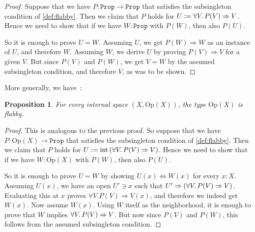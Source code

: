 \documentclass[11pt, oneside, article]{memoir}
\theoremstyle{plain}
\newtheorem{proposition}[theorem]{Proposition}
\theoremstyle{definition}
\theoremstyle{remark}
\DeclareMathOperator{\interior}{int}
\newcommand{\const}[1]{\mathtt{#1}}
\newcommand{\Set}[1]{\mathrm{#1}}
\newcommand{\Prop}{\const{Prop}}
\newcommand{\Op}{\Set{Op}}
\newcommand{\imp}{\Rightarrow}
\begin{document}
\begin{proof}
Suppose that we have $P : \Prop \to \Prop$ that satisfies the subsingleton condition of \cref{def:flabby}. Then we claim that $P$ holds for $U := \forall V \ldotp P(V) \imp V$. Hence we need to show that if we have $W : \Prop$ with $P(W)$, then also $P(U)$.

So it is enough to prove $U = W$. Assuming $U$, we get $P(W) \imp W$ as an instance of $U$, and therefore $W$. Assuming $W$, we derive $U$ by proving $P(V) \imp V$ for a given $V$. But since $P(V)$ and $P(W)$, we get $V = W$ by the assumed subsingleton condition, and therefore $V$, as was to be shown.
\end{proof}

More generally, we have~\cite[Lemma~1.2]{moerdijk}:

\begin{proposition}
	\label{prop:opens_flabby}
	For every internal space $(X,\Op(X))$, the type $\Op(X)$ is flabby.
\end{proposition}

\begin{proof}
This is analogous to the previous proof. So suppose that we have $P : \Op(X) \to \Prop$ that satisfies the subsingleton condition of \cref{def:flabby}. Then we claim that $P$ holds for $U := \interior\left(\forall V \ldotp P(V) \imp V\right)$. Hence we need to show that if we have $W : \Op(X)$ with $P(W)$, then also $P(U)$.

	So it is enough to prove $U = W$ by showing $U(x) \Leftrightarrow W(x)$ for every $x : X$. Assuming $U(x)$, we have an open $U'\ni x$ such that $U' \imp (\forall V \ldotp P(V) \imp V)$. Evaluating this at $x$ proves $\forall V. P(V) \imp V(x)$, and therefore we indeed get $W(x)$. Now assume $W(x)$. Using $W$ itself as the neighborhood, it is enough to prove that $W$ implies $\forall V\ldotp P(V) \imp V$. But now since $P(V)$ and $P(W)$, this follows from the assumed subsingleton condition.
\end{proof}

\end{document}
